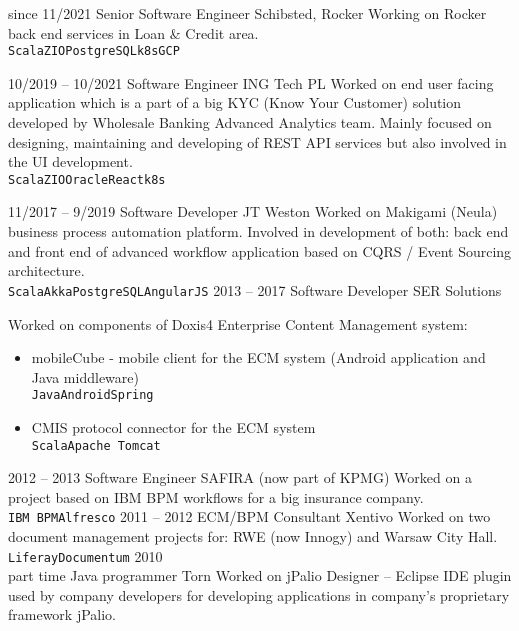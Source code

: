 \documentclass[8pt]{developercv} %
\begin{document}
\begin{entrylist}
	\entry
		{since 11/2021}
		{Senior Software Engineer}
		{Schibsted, Rocker}
    {Working on Rocker back end services in Loan \& Credit area.\\
		\texttt{Scala}\slashsep\texttt{ZIO}\slashsep\texttt{PostgreSQL}\slashsep\texttt{k8s}\slashsep\texttt{GCP}}

	\entry
		{10/2019 -- 10/2021}
		{Software Engineer}
		{ING Tech PL}
		{Worked on end user facing application which is a part of a big KYC (Know Your Customer) solution developed by Wholesale Banking Advanced Analytics team. Mainly focused on designing, maintaining and developing of REST API services but also involved in the UI development.\\
		\texttt{Scala}\slashsep\texttt{ZIO}\slashsep\texttt{Oracle}\slashsep\texttt{React}\slashsep\texttt{k8s}}

	\entry
		{11/2017 -- 9/2019}
		{Software Developer}
		{JT Weston}
		{Worked on Makigami (Neula) business process automation platform. Involved in development of both: back end and front end of advanced workflow application based on CQRS / Event Sourcing architecture.\\
		\texttt{Scala}\slashsep\texttt{Akka}\slashsep\texttt{PostgreSQL}\slashsep\texttt{AngularJS}}
	\entry
		{2013 -- 2017}
		{Software Developer}
		{SER Solutions}
		{Worked on components of Doxis4 Enterprise Content Management system:
		\begin{itemize}
			\item mobileCube - mobile client for the ECM system (Android application and Java middleware) \\ \texttt{Java}\slashsep\texttt{Android}\slashsep\texttt{Spring}
			\item CMIS protocol connector for the ECM system \\ \texttt{Scala}\slashsep\texttt{Apache Tomcat}
		\end{itemize}}
	\entry
		{2012 -- 2013}
		{Software Engineer}
		{SAFIRA (now part of KPMG)}
		{Worked on a project based on IBM BPM workflows for a big insurance company. \\ \texttt{IBM BPM}\slashsep\texttt{Alfresco}}
	\entry
		{2011 -- 2012}
		{ECM/BPM Consultant}
		{Xentivo}
		{Worked on two document management projects for: RWE (now Innogy) and Warsaw City Hall. \\ \texttt{Liferay}\slashsep\texttt{Documentum}}
	\entry
		{2010 \\\footnotesize{part time}}
		{Java programmer}
		{Torn}
		{Worked on jPalio Designer -- Eclipse IDE plugin used by company developers for developing applications in company's proprietary framework jPalio.}
			
\end{entrylist}
\end{document}
